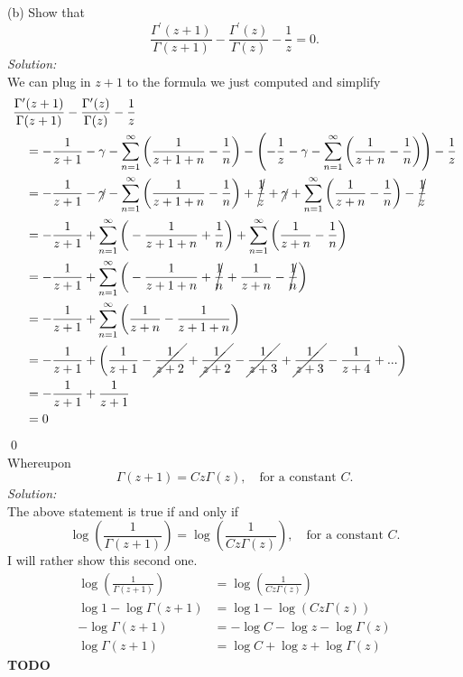\documentclass[10pt]{amsart}
\theoremstyle{nonumberplain}
\begin{document}
\begin{enumerate}[label={\bf {\arabic*}:}]
\noindent
(b) Show that
$$
\frac {\Gamma^\prime(z + 1)} {\Gamma(z + 1)} - \frac {\Gamma^\prime(z)} {\Gamma(z)} - \frac 1 z = 0.
$$
\textit{Solution:} \\
We can plug in $z + 1$ to the formula we just computed and simplify
\begin{align*}
&\frac {\Gamma^\prime(z + 1)} {\Gamma(z + 1)} - \frac {\Gamma^\prime(z)} {\Gamma(z)} - \frac 1 z \\
	& \quad = - \frac 1 {z + 1} - \gamma - \sum_{n=1}^\infty \bigg( \frac 1 {z + 1 + n} - \frac 1 n \bigg) - \left(- \frac 1 z - \gamma - \sum_{n=1}^\infty \bigg( \frac 1 {z + n} - \frac 1 n \bigg) \right) - \frac 1 z \\
	& \quad = - \frac 1 {z + 1} - \cancel{\gamma} - \sum_{n=1}^\infty \bigg( \frac 1 {z + 1 + n} - \frac 1 n \bigg) + \cancel{\frac 1 z} + \cancel{\gamma} + \sum_{n=1}^\infty \bigg( \frac 1 {z + n} - \frac 1 n \bigg) - \cancel{\frac 1 z} \\
	& \quad = - \frac 1 {z + 1} + \sum_{n=1}^\infty \bigg( - \frac 1 {z + 1 + n} + \frac 1 n \bigg) + \sum_{n=1}^\infty \bigg( \frac 1 {z + n} - \frac 1 n \bigg) \\
	& \quad = - \frac 1 {z + 1} + \sum_{n=1}^\infty \bigg( - \frac 1 {z + 1 + n} + \cancel{\frac 1 n} + \frac 1 {z + n} - \cancel{\frac 1 n} \bigg) \\
	& \quad = - \frac 1 {z + 1} + \sum_{n=1}^\infty \bigg(\frac 1 {z + n}  - \frac 1 {z + 1 + n} \bigg) \\
	& \quad = - \frac 1 {z + 1} + \bigg(\frac 1 {z + 1}  - \cancel{\frac 1 {z + 2}} + \cancel{\frac 1 {z + 2}}  - \cancel{\frac 1 {z + 3}} + \cancel{\frac 1 {z + 3}}  - \frac 1 {z + 4} + ... \bigg) \\
	& \quad = - \frac 1 {z + 1} + \frac 1 {z + 1} \\
	& \quad = 0
\end{align*}
\qed \\
Whereupon
$$ \Gamma(z + 1) = Cz\Gamma(z), \quad \text{for a constant $C$}. $$
\textit{Solution:} \\
The above statement is true if and only if
$$ \log \left( \frac 1 {\Gamma(z + 1)} \right) = \log \left ( \frac 1 {Cz\Gamma(z)} \right), \quad \text{for a constant $C$}. $$
I will rather show this second one.
\begin{align*}
\log \left( \frac 1 {\Gamma(z + 1)} \right) &= \log \left ( \frac 1 {Cz\Gamma(z)} \right) \\
\log 1 -  \log \Gamma(z + 1) &= \log 1 - \log (Cz\Gamma(z)) \\
- \log \Gamma(z + 1) &= - \log C - \log z - \log \Gamma(z) \\
\log \Gamma(z + 1) &= \log C + \log z + \log \Gamma(z)
\end{align*}
\textbf{TODO} \\


\end{enumerate}
\end{document}
